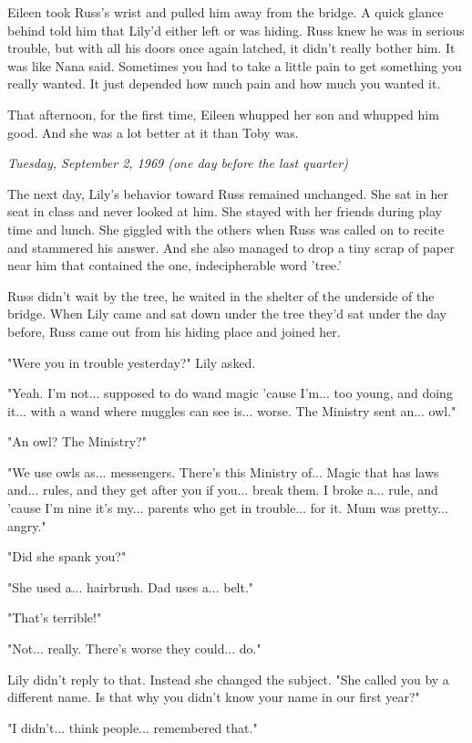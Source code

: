 \documentclass[a4paper,11pt]{article}
\begin{document}
Eileen took Russ's wrist and pulled him away from the bridge. A quick glance behind told him that Lily'd either left or was hiding. Russ knew he was in serious trouble, but with all his doors once again latched, it didn't really bother him. It was like Nana said. Sometimes you had to take a little pain to get something you really wanted. It just depended how much pain and how much you wanted it.

That afternoon, for the first time, Eileen whupped her son and whupped him good. And she was a lot better at it than Toby was.

\emph{Tuesday, September 2, 1969 (one day before the last quarter)}

The next day, Lily's behavior toward Russ remained unchanged. She sat in her seat in class and never looked at him. She stayed with her friends during play time and lunch. She giggled with the others when Russ was called on to recite and stammered his answer. And she also managed to drop a tiny scrap of paper near him that contained the one, indecipherable word 'tree.'

Russ didn't wait by the tree, he waited in the shelter of the underside of the bridge. When Lily came and sat down under the tree they'd sat under the day before, Russ came out from his hiding place and joined her.

"Were you in trouble yesterday?" Lily asked.

"Yeah. I'm not... supposed to do wand magic 'cause I'm... too young, and doing it... with a wand where muggles can see is... worse. The Ministry sent an... owl."

"An owl? The Ministry?"

"We use owls as... messengers. There's this Ministry of... Magic that has laws and... rules, and they get after you if you... break them. I broke a... rule, and 'cause I'm nine it's my... parents who get in trouble... for it. Mum was pretty... angry."

"Did she spank you?"

"She used a... hairbrush. Dad uses a... belt."

"That's terrible!"

"Not... really. There's worse they could... do."

Lily didn't reply to that. Instead she changed the subject. "She called you by a different name. Is that why you didn't know your name in our first year?"

"I didn't... think people... remembered that."
\end{document}
